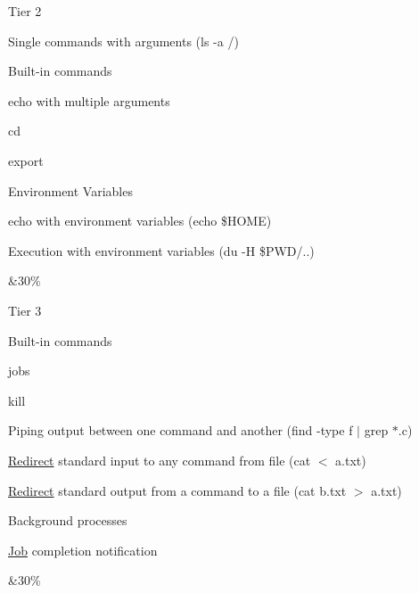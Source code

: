 \begin{longtabu}
\begin{DoxyItemize}
\item Tier 2  
\begin{DoxyItemize}
\item Single commands with arguments (ls -\/a /)  
\item Built-\/in commands  
\begin{DoxyItemize}
\item echo with multiple arguments  
\item cd  
\item export  
\end{DoxyItemize}
\item Environment Variables  
\begin{DoxyItemize}
\item echo with environment variables (echo \$\+H\+O\+ME)  
\item Execution with environment variables (du -\/H \$\+P\+WD/..) 
\end{DoxyItemize}
\end{DoxyItemize}
\end{DoxyItemize}&30\%   \\

\begin{DoxyItemize}
\item Tier 3  
\begin{DoxyItemize}
\item Built-\/in commands  
\begin{DoxyItemize}
\item jobs  
\item kill  
\end{DoxyItemize}
\item Piping output between one command and another (find -\/type f $|$ grep \textquotesingle{}$\ast$.c\textquotesingle{})  
\item \hyperlink{structRedirect}{Redirect} standard input to any command from file (cat $<$ a.\+txt)  
\item \hyperlink{structRedirect}{Redirect} standard output from a command to a file (cat b.\+txt $>$ a.\+txt)  
\item Background processes  
\begin{DoxyItemize}
\item \hyperlink{structJob}{Job} completion notification  
\end{DoxyItemize}
\end{DoxyItemize}
\end{DoxyItemize}&30\%   \\


\end{longtabu}
